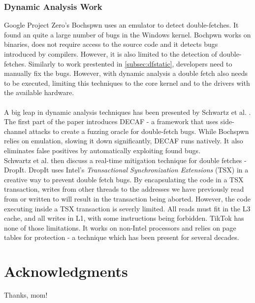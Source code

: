 \subsubsection{Dynamic Analysis Work}
Google Project Zero's Bochspwn \cite{jurczyk2013bochspwn} uses an emulator to detect double-fetches. It found an quite a large number of bugs in the Windows
kernel. Bochpwn works on binaries, does not require access to the source code and it detects bugs introduced by compilers. However, it is also limited to the
detection of double-fetches. Similarly to work prestented in \cref{subsec:dfstatic}, developers need to manually fix the bugs. However, with dynamic analysis
a double fetch also needs to be executed, limiting this techniques to the core kernel and to the drivers with the available hardware.
\\
\\
A big leap in dynamic analysis techniques has been presented by Schwartz et al. \cite{schwarz2018automated}. The first part of the paper introduces DECAF - a framework
that uses side-channel attacks to create a fuzzing oracle for double-fetch bugs. While Bochspwn relies on emulation, slowing it down significantly, DECAF
runs natively. It also eliminates false positives by automatically exploiting found bugs.
\\
Schwartz et al. then discuss a real-time mitigation technique for double fetches - DropIt. DropIt uses Intel's \emph{Transactional Synchronization Extensions} (TSX)
\cite{intel64and} in a creative way to prevent double fetch bugs. By encapsulating the code in a TSX transaction, writes from other threads to the addresses we have
previously read from or written to will result in the transaction being aborted. However, the code executing inside a TSX transaction is severly limited. All reads
must fit in the L3 cache, and all writes in L1, with some instructions being forbidden. TikTok has none of those limitations. It works on non-Intel processors
and relies on page tables for protection - a technique which has been present for several decades.


\section*{Acknowledgments}

Thanks, mom!

